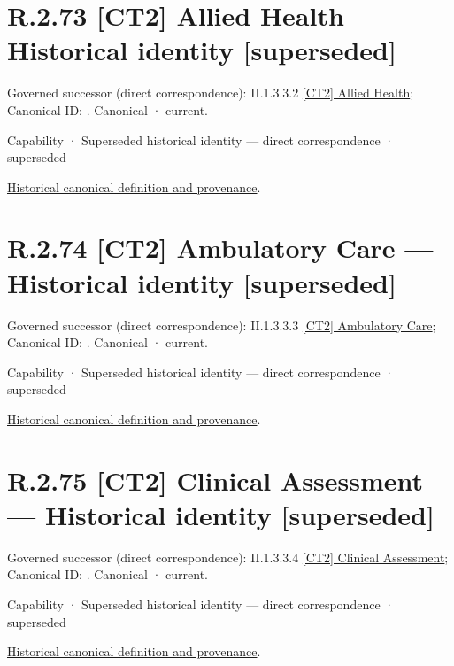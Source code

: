 \section*{R.2.73 [CT2] Allied Health — Historical identity [superseded]}
\label{navigation:R.2.73}

{\small Governed successor (direct correspondence): II.1.3.3.2 \hyperref[element:63cd714a3e2a4354aa5383b189fea566]{[CT2] Allied Health}; Canonical ID: \texttt{}. Canonical · current.}\par
\label{element:6cd45c27d0c344b9807174dbd812d572}
{\small Capability · Superseded historical identity — direct correspondence · superseded}\par
\href{../../../../continuum/strategy/capability/6cd45c27d0c344b9807174dbd812d572.md}{Historical canonical definition and provenance}.\par
\section*{R.2.74 [CT2] Ambulatory Care — Historical identity [superseded]}
\label{navigation:R.2.74}

{\small Governed successor (direct correspondence): II.1.3.3.3 \hyperref[element:f74d7c3a39c540c4b462576e8f09fc58]{[CT2] Ambulatory Care}; Canonical ID: \texttt{}. Canonical · current.}\par
\label{element:e996b61b6e7b4619913f427aed2b55b1}
{\small Capability · Superseded historical identity — direct correspondence · superseded}\par
\href{../../../../continuum/strategy/capability/e996b61b6e7b4619913f427aed2b55b1.md}{Historical canonical definition and provenance}.\par
\section*{R.2.75 [CT2] Clinical Assessment — Historical identity [superseded]}
\label{navigation:R.2.75}

{\small Governed successor (direct correspondence): II.1.3.3.4 \hyperref[element:a7d84c95e48c453797419813ca80a66c]{[CT2] Clinical Assessment}; Canonical ID: \texttt{}. Canonical · current.}\par
\label{element:1c3b553c87704e27ba211fbbd02d95cb}
{\small Capability · Superseded historical identity — direct correspondence · superseded}\par
\href{../../../../continuum/strategy/capability/1c3b553c87704e27ba211fbbd02d95cb.md}{Historical canonical definition and provenance}.\par
